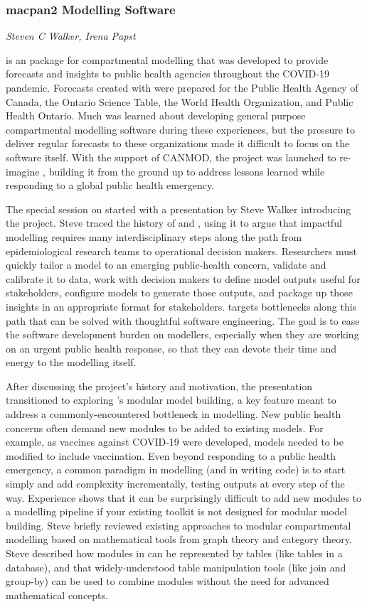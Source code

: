 \subsubsection{macpan2 Modelling Software}

\textit{Steven C Walker, Irena Papst}

\macpanOrig is an \R package for compartmental modelling that was developed to provide forecasts and insights to public health agencies throughout the COVID-19 pandemic. Forecasts created with \macpanOrig were prepared for the Public Health Agency of Canada, the Ontario Science Table, the World Health Organization, and Public Health Ontario. Much was learned about developing general purpose compartmental modelling software during these experiences, but the pressure to deliver regular forecasts to these organizations made it difficult to focus on the software itself. With the support of CANMOD, the \macpan project was launched to re-imagine \macpanOrig, building it from the ground up to address lessons learned while responding to a global public health emergency.

The special session on \macpan started with a presentation by Steve Walker introducing the project. Steve traced the history of \macpanOrig and \macpan, using it to argue that impactful modelling requires many interdisciplinary steps along the path from epidemiological research teams to operational decision makers. Researchers must quickly tailor a model to an emerging public-health concern, validate and calibrate it to data, work with decision makers to define model outputs useful for stakeholders, configure models to generate those outputs, and package up those insights in an appropriate format for stakeholders. \macpan targets bottlenecks along this path that can be solved with thoughtful software engineering. The goal is to ease the software development burden on modellers, especially when they are working on an urgent public health response, so that they can devote their time and energy to the modelling itself.

After discussing the project's history and motivation, the presentation transitioned to exploring \macpan's modular model building, a key feature meant to address a commonly-encountered bottleneck in modelling. New public health concerns often demand new modules to be added to existing models. For example, as vaccines against COVID-19 were developed, models needed to be modified to include vaccination. Even beyond responding to a public health emergency, a common paradigm in modelling (and in writing code) is to start simply and add complexity incrementally, testing outputs at every step of the way. Experience shows that it can be surprisingly difficult to add new modules to a modelling pipeline if your existing toolkit is not designed for modular model building. Steve briefly reviewed existing approaches to modular compartmental modelling based on mathematical tools from graph theory and category theory. Steve described how modules in \macpan can be represented by tables (like tables in a database), and that widely-understood table manipulation tools (like join and group-by) can be used to combine modules without the need for advanced mathematical concepts.

